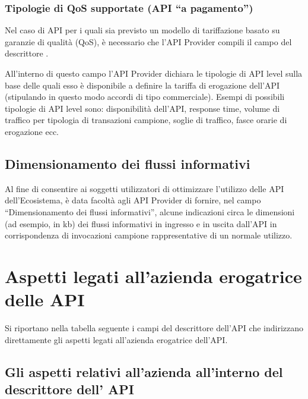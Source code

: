 \documentclass[letterpaper,10pt,italian]{sphinxmanual}
\begin{document}
\subsubsection{Tipologie di QoS supportate (API “a pagamento”)}
\label{\detokenize{sez25:sezione2532}}\label{\detokenize{sez25:tipologie-di-qos-supportate-api-a-pagamento}}
Nel caso di API  per i quali sia previsto un modello di tariffazione basato su garanzie di qualità (QoS), è necessario che  l’API Provider compili il campo del descrittore .

All’interno di questo campo l’API Provider dichiara le tipologie di API level sulla base delle quali esso è disponibile a definire la tariffa di erogazione dell’API (stipulando in questo modo accordi di tipo commerciale). Esempi di possibili tipologie di API level sono: disponibilità dell’API, response time, volume di traffico per tipologia di transazioni campione, soglie di traffico, fasce orarie di erogazione ecc.


\subsection{Dimensionamento dei flussi informativi}
\label{\detokenize{sez25:sezione254}}\label{\detokenize{sez25:dimensionamento-dei-flussi-informativi}}
Al fine di consentire ai soggetti utilizzatori di ottimizzare l’utilizzo delle API dell’Ecosistema, è data facoltà agli API Provider di fornire, nel campo “Dimensionamento dei flussi informativi”, alcune indicazioni circa le dimensioni (ad esempio, in kb) dei flussi informativi in ingresso e in uscita dall’API in corrispondenza di invocazioni campione rappresentative di un normale utilizzo.


\section{Aspetti legati all’azienda erogatrice delle API}
\label{\detokenize{sez26:sezione26}}\label{\detokenize{sez26::doc}}\label{\detokenize{sez26:aspetti-legati-allazienda-erogatrice-delle-api}}


Si riportano nella tabella seguente i campi del descrittore dell’API che indirizzano direttamente gli aspetti legati all’azienda erogatrice dell’API.


\subsection{Gli aspetti relativi all’azienda all’interno del descrittore dell’ API}
\label{\detokenize{sez26:sezione261}}\label{\detokenize{sez26:gli-aspetti-relativi-allazienda-allinterno-del-descrittore-dell-api}}
\end{document}
